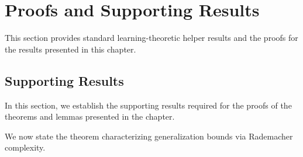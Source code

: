\section{Proofs and Supporting Results}\label{sec:proofs_ch4}

This section provides standard learning-theoretic helper results and the proofs for the results presented in this chapter.

\subsection{Supporting Results}


In this section, we establish the supporting results required for the proofs of the theorems and lemmas presented in the chapter.

We now state the theorem characterizing generalization bounds via Rademacher complexity.

